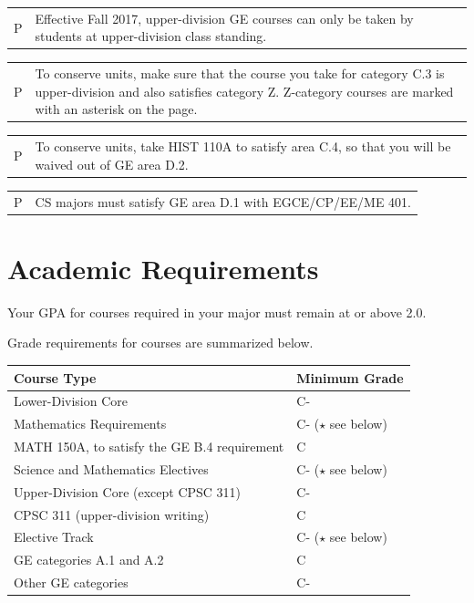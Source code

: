 \documentclass{book}
\newenvironment{tip}{
  \tcolorbox \begin{tabular}{m{.5in} m{5in}} \Large{P} &
}{
  \end{tabular} \endtcolorbox
}
\begin{document}
\begin{tip}
Effective Fall 2017, upper-division GE courses can only be taken by students at
upper-division class standing.
\end{tip}

\begin{tip}
To conserve units, make sure that the course you take for category C.3 is upper-division and also satisfies category Z. Z-category courses are marked with an asterisk on the \gecourselist page.
\end{tip}

\begin{tip}
  To conserve units, take HIST 110A to satisfy area C.4, so that you will be waived out of GE area D.2.
  \end{tip}

\begin{tip}
CS majors must satisfy GE area D.1 with EGCE/CP/EE/ME 401.
\end{tip}

\section{Academic Requirements}

Your GPA for courses required in your major must remain at or above 2.0.

Grade requirements for courses are summarized below.

\begin{center}
\begin{tabular}{|l|l|} \hline
  \textbf{Course Type} & \textbf{Minimum Grade} \\ \hline
  Lower-Division Core & C- \\ \hline
  Mathematics Requirements & C- ($\star$ see below) \\ \hline
  MATH 150A, to satisfy the GE B.4 requirement & C \\ \hline
  Science and Mathematics Electives & C- ($\star$ see below) \\ \hline
  Upper-Division Core (except CPSC 311) & C- \\ \hline
  CPSC 311 (upper-division writing) & C \\ \hline
  Elective Track & C- ($\star$ see below) \\ \hline
  GE categories A.1 and A.2 & C \\ \hline
  Other GE categories & C- \\ \hline
\end{tabular}
\end{center}
\end{document}
